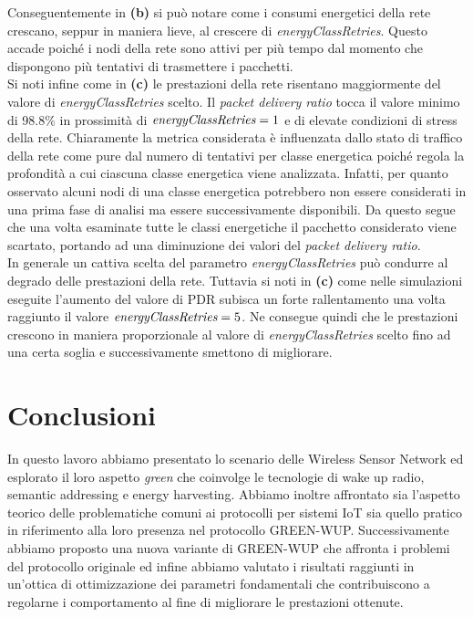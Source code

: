 \documentclass[binding=0.6cm,TFA]{sapthesis}
\begin{document}
Conseguentemente in \textbf{(b)} si può notare come i consumi energetici della rete crescano, seppur in maniera lieve, al crescere di \emph{energyClassRetries}.
Questo accade poiché i nodi della rete sono attivi per più tempo dal momento che dispongono più tentativi di trasmettere i pacchetti.\\

Si noti infine come in \textbf{(c)} le prestazioni della rete risentano maggiormente del valore di \emph{energyClassRetries} scelto. Il \emph{packet delivery ratio}
tocca il valore minimo di 98.8\% in prossimità di $\emph{energyClassRetries}=1$ e di elevate condizioni di stress della rete. Chiaramente la metrica considerata
è influenzata dallo stato di traffico della rete come pure dal numero di tentativi per classe energetica poiché regola la profondità a cui ciascuna classe
energetica viene analizzata. Infatti, per quanto osservato alcuni nodi di una classe energetica potrebbero non essere considerati in una prima fase di analisi
ma essere successivamente disponibili. Da questo segue che una volta esaminate tutte le classi energetiche il pacchetto considerato viene scartato, portando
ad una diminuzione dei valori del \emph{packet delivery ratio}.\\

In generale un cattiva scelta del parametro \emph{energyClassRetries} può condurre al degrado delle prestazioni della rete. Tuttavia si noti in \textbf{(c)}
come nelle simulazioni eseguite l'aumento del valore di PDR subisca un forte rallentamento una volta raggiunto il valore $\emph{energyClassRetries}=5$. Ne
consegue quindi che le prestazioni crescono in maniera proporzionale al valore di \emph{energyClassRetries} scelto fino ad una certa soglia e
successivamente smettono di migliorare.

\chapter{Conclusioni}

In questo lavoro abbiamo presentato lo scenario delle Wireless Sensor Network ed esplorato il loro aspetto \emph{green} che coinvolge le tecnologie di
wake up radio, semantic addressing e energy harvesting. Abbiamo inoltre affrontato sia l'aspetto teorico delle problematiche comuni ai protocolli per sistemi IoT
sia quello pratico in riferimento alla loro presenza nel protocollo GREEN-WUP. Successivamente abbiamo proposto una nuova variante di GREEN-WUP
che affronta i problemi del protocollo originale ed infine abbiamo valutato i risultati raggiunti in un'ottica di ottimizzazione dei parametri fondamentali
che contribuiscono a regolarne i comportamento al fine di migliorare le prestazioni ottenute.\\
\end{document}

